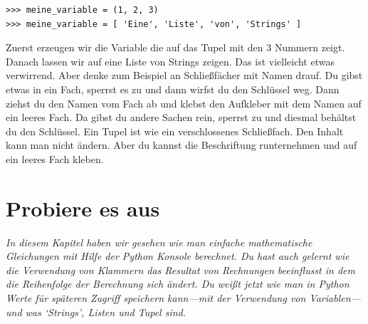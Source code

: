 \begin{Verbatim}[frame=single]
>>> meine_variable = (1, 2, 3)
>>> meine_variable = [ 'Eine', 'Liste', 'von', 'Strings' ]
\end{Verbatim}

Zuerst erzeugen wir die Variable  die auf das Tupel mit den 3 Nummern zeigt. Danach lassen wir  auf eine Liste von Strings zeigen. Das ist vielleicht etwas verwirrend. Aber denke zum Beispiel an Schließfächer mit Namen drauf. Du gibst etwas in ein Fach, sperrst es zu und dann wirfst du den Schlüssel weg. Dann ziehst du den Namen vom Fach ab und klebst den Aufkleber mit dem Namen auf ein leeres Fach. Da gibst du andere Sachen rein, sperrst zu und diesmal behältst du den Schlüssel. Ein Tupel ist wie ein verschlossenes Schließfach. Den Inhalt kann man nicht ändern.  Aber du kannst die Beschriftung runternehmen und auf ein leeres Fach kleben.

\section{Probiere es aus}

\emph{In diesem Kapitel haben wir gesehen wie man einfache mathematische Gleichungen mit Hilfe der Python Konsole berechnet. Du hast auch gelernt wie die Verwendung von Klammern das Resultat von Rechnungen beeinflusst in dem die Reihenfolge der Berechnung sich ändert. Du weißt jetzt wie man in Python Werte für späteren Zugriff speichern kann---mit der Verwendung von Variablen---und was `Strings', Listen und Tupel sind.}
\par

